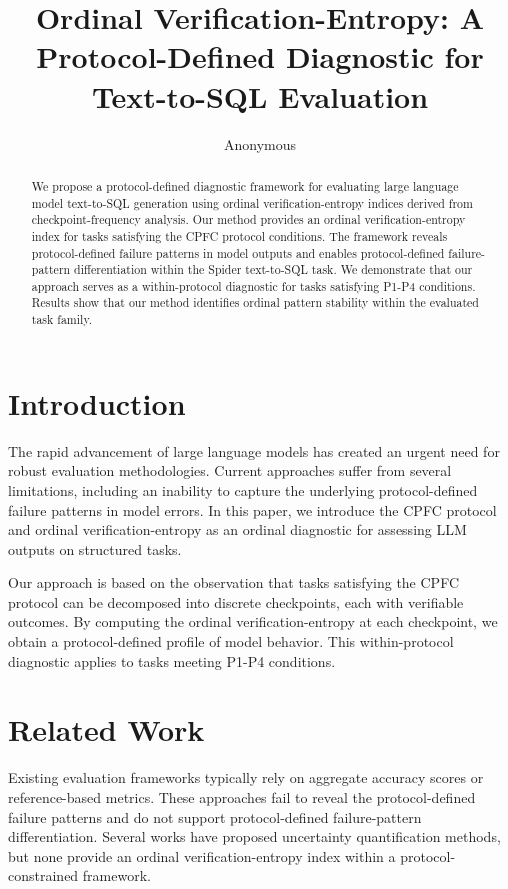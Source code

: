 \documentclass[11pt]{article}
\title{Ordinal Verification-Entropy: A Protocol-Defined Diagnostic for Text-to-SQL Evaluation}
\author{Anonymous}
\begin{document}
\maketitle

\begin{abstract}
We propose a protocol-defined diagnostic framework for evaluating large language model text-to-SQL generation using ordinal verification-entropy indices derived from checkpoint-frequency analysis. Our method provides an ordinal verification-entropy index for tasks satisfying the CPFC protocol conditions. The framework reveals protocol-defined failure patterns in model outputs and enables protocol-defined failure-pattern differentiation within the Spider text-to-SQL task. We demonstrate that our approach serves as a within-protocol diagnostic for tasks satisfying P1-P4 conditions. Results show that our method identifies ordinal pattern stability within the evaluated task family.
\end{abstract}

\section{Introduction}
The rapid advancement of large language models has created an urgent need for robust evaluation methodologies. Current approaches suffer from several limitations, including an inability to capture the underlying protocol-defined failure patterns in model errors. In this paper, we introduce the CPFC protocol and ordinal verification-entropy as an ordinal diagnostic for assessing LLM outputs on structured tasks.

Our approach is based on the observation that tasks satisfying the CPFC protocol can be decomposed into discrete checkpoints, each with verifiable outcomes. By computing the ordinal verification-entropy at each checkpoint, we obtain a protocol-defined profile of model behavior. This within-protocol diagnostic applies to tasks meeting P1-P4 conditions.

\section{Related Work}
Existing evaluation frameworks typically rely on aggregate accuracy scores or reference-based metrics. These approaches fail to reveal the protocol-defined failure patterns and do not support protocol-defined failure-pattern differentiation. Several works have proposed uncertainty quantification methods, but none provide an ordinal verification-entropy index within a protocol-constrained framework.
\end{document}
